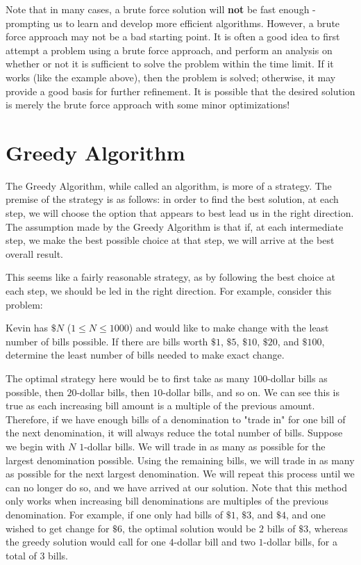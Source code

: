Note that in many cases, a brute force solution will \textbf{not} be fast enough - prompting us to learn and develop more efficient algorithms.  However, a brute force approach may not be a bad starting point.  It is often a good idea to first attempt a problem using a brute force approach, and perform an analysis on whether or not it is sufficient to solve the problem within the time limit.  If it works (like the example above), then the problem is solved; otherwise, it may provide a good basis for further refinement.  It is possible that the desired solution is merely the brute force approach with some minor optimizations!

\section{Greedy Algorithm} \label{greedy}

The Greedy Algorithm, while called an algorithm, is more of a strategy.  The premise of the strategy is as follows: in order to find the best solution, at each step, we will choose the option that appears to best lead us in the right direction.  The assumption made by the Greedy Algorithm is that if, at each intermediate step, we make the best possible choice at that step, we will arrive at the best overall result.

This seems like a fairly reasonable strategy, as by following the best choice at each step, we should be led in the right direction.  For example, consider this problem:

\begin{Problem}
Kevin has $ \$N $ ($ 1 \leq N \leq 1000 $) and would like to make change with the least number of bills possible.  If there are bills worth $ \$1 $, $ \$5 $, $ \$10 $, $ \$20 $, and $ \$100 $, determine the least number of bills needed to make exact change.
\end{Problem}

The optimal strategy here would be to first take as many $ 100 $-dollar bills as possible, then $ 20 $-dollar bills, then $ 10 $-dollar bills, and so on.  We can see this is true as each increasing bill amount is a multiple of the previous amount.  Therefore, if we have enough bills of a denomination to "trade in" for one bill of the next denomination, it will always reduce the total number of bills.  Suppose we begin with $ N $ $ 1 $-dollar bills.  We will trade in as many as possible for the largest denomination possible.  Using the remaining bills, we will trade in as many as possible for the next largest denomination.  We will repeat this process until we can no longer do so, and we have arrived at our solution.  Note that this method only works when increasing bill denominations are multiples of the previous denomination.  For example, if one only had bills of $ \$1 $, $ \$3 $, and $ \$ 4 $, and one wished to get change for $ \$6 $, the optimal solution would be $ 2 $ bills of $ \$3 $, whereas the greedy solution would call for one $ 4 $-dollar bill and two $ 1 $-dollar bills, for a total of $ 3 $ bills.

